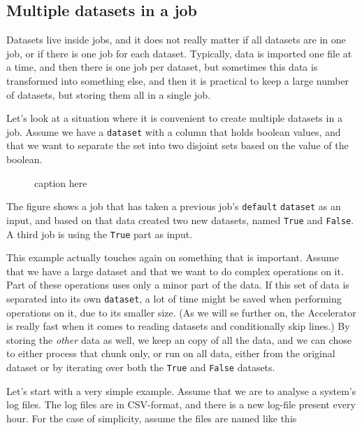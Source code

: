\documentclass[a4paper]{article}
\begin{document}
\subsection{Multiple datasets in a job}
Datasets live inside jobs, and it does not really matter if all
datasets are in one job, or if there is one job for each dataset.
Typically, data is imported one file at a time, and then there is one
job per dataset, but sometimes this data is transformed into something
else, and then it is practical to keep a large number of datasets, but
storing them all in a single job.

Let's look at a situation where it is convenient to create multiple
datasets in a job.  Assume we have a \texttt{dataset} with a column
that holds boolean values, and that we want to separate the set into
two disjoint sets based on the value of the boolean.

\begin{figure}[h!]
  \begin{center}
    
    \caption{caption here}
    \label{fig:dep_dataset_csvimport_chain}
  \end{center}
\end{figure}

The figure shows a job that has taken a previous job's
\texttt{default} \texttt{dataset} as an input, and based on that data
created two new datasets, named \texttt{True} and \texttt{False}.  A
third job is using the \texttt{True} part as input.

This example actually touches again on something that is important.
Assume that we have a large dataset and that we want to do complex
operations on it.  Part of these operations uses only a minor part of
the data.  If this set of data is separated into its own
\texttt{dataset}, a lot of time might be saved when performing
operations on it, due to its smaller size.  (As we will se further on,
the Accelerator is really fast when it comes to reading datasets and
conditionally skip lines.)  By storing the \textsl{other} data as
well, we keep an copy of all the data, and we can chose to either
process that chunk only, or run on all data, either from the original
dataset or by iterating over both the \texttt{True} and \texttt{False}
datasets.










\clearpage


Let's start with a very simple example.  Assume that we are to analyse
a system's log files.  The log files are in CSV-format, and there is a
new log-file present every hour.  For the case of simplicity, assume
the files are named like this
\end{document}

